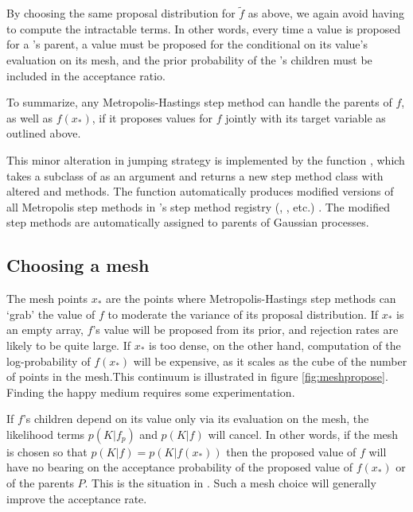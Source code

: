 By choosing the same proposal distribution for $\tilde f$ as above, we again avoid having to compute the intractable terms. In other words, every time a value is proposed for a 's parent, a value must be proposed for the   conditional on its value's evaluation on its mesh, and the prior probability of the 's children must be included in the acceptance ratio.

\smallskip
To summarize, any Metropolis-Hastings step method can handle the parents of $f$, as well as $f(x_*)$, if it proposes values for $f$ jointly with its target variable as outlined above. 

This minor alteration in jumping strategy is implemented by the function , which takes a subclass of  as an argument and returns a new step method class with altered  and  methods. The function automatically produces modified versions of all Metropolis step methods in 's step method registry (, , etc.) \citep{pymc}. The modified step methods are automatically assigned to parents of Gaussian processes.

\subsection{Choosing a mesh} 

The mesh points $x_*$ are the points where Metropolis-Hastings step methods can `grab' the value of $f$ to moderate the variance of its proposal distribution. If $x_*$ is an empty array, $f$'s value will be proposed from its prior, and rejection rates are likely to be quite large. If $x_*$ is too dense, on the other hand, computation of the log-probability of $f(x_*)$ will be expensive, as it scales as the cube of the number of points in the mesh.This continuum is illustrated in figure \ref{fig:meshpropose}. Finding the happy medium requires some experimentation.

If $f$'s children depend on its value only via its evaluation on the mesh, the likelihood terms $p(K|f_p)$ and $p(K|f)$ will cancel. In other words, if the mesh is chosen so that $p(K|f)=p(K|f(x_*))$ then the proposed value of $f$ will have no bearing on the acceptance probability of the proposed value of $f(x_*)$ or of the parents $P$. This is the situation in . Such a mesh choice will generally improve the acceptance rate.

